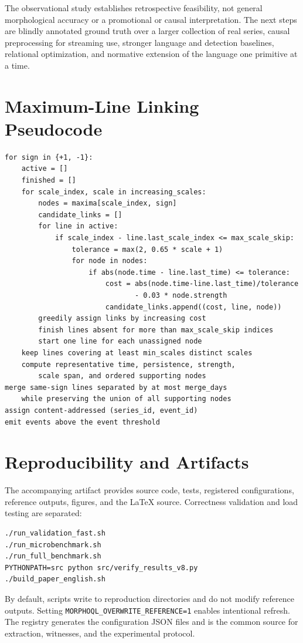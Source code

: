 \documentclass[11pt,a4paper]{article}
\newcommand{\code}[1]{\texttt{#1}}
\begin{document}
The observational study establishes retrospective feasibility, not general morphological accuracy or a promotional or causal interpretation. The next steps are blindly annotated ground truth over a larger collection of real series, causal preprocessing for streaming use, stronger language and detection baselines, relational optimization, and normative extension of the language one primitive at a time.

\appendix

\section{Maximum-Line Linking Pseudocode}

\begin{lstlisting}[language={},basicstyle=\ttfamily\footnotesize]
for sign in {+1, -1}:
    active = []
    finished = []
    for scale_index, scale in increasing_scales:
        nodes = maxima[scale_index, sign]
        candidate_links = []
        for line in active:
            if scale_index - line.last_scale_index <= max_scale_skip:
                tolerance = max(2, 0.65 * scale + 1)
                for node in nodes:
                    if abs(node.time - line.last_time) <= tolerance:
                        cost = abs(node.time-line.last_time)/tolerance
                               - 0.03 * node.strength
                        candidate_links.append((cost, line, node))
        greedily assign links by increasing cost
        finish lines absent for more than max_scale_skip indices
        start one line for each unassigned node
    keep lines covering at least min_scales distinct scales
    compute representative time, persistence, strength,
        scale span, and ordered supporting nodes
merge same-sign lines separated by at most merge_days
    while preserving the union of all supporting nodes
assign content-addressed (series_id, event_id)
emit events above the event threshold
\end{lstlisting}

\section{Reproducibility and Artifacts}

The accompanying artifact provides source code, tests, registered configurations, reference outputs, figures, and the \LaTeX{} source. Correctness validation and load testing are separated:
\begin{lstlisting}[language={},basicstyle=\ttfamily\footnotesize]
./run_validation_fast.sh
./run_microbenchmark.sh
./run_full_benchmark.sh
PYTHONPATH=src python src/verify_results_v8.py
./build_paper_english.sh
\end{lstlisting}
By default, scripts write to reproduction directories and do not modify reference outputs. Setting \code{MORPHOQL\_OVERWRITE\_REFERENCE=1} enables intentional refresh. The  registry generates the configuration JSON files and is the common source for extraction, witnesses, and the experimental protocol.
\end{document}
